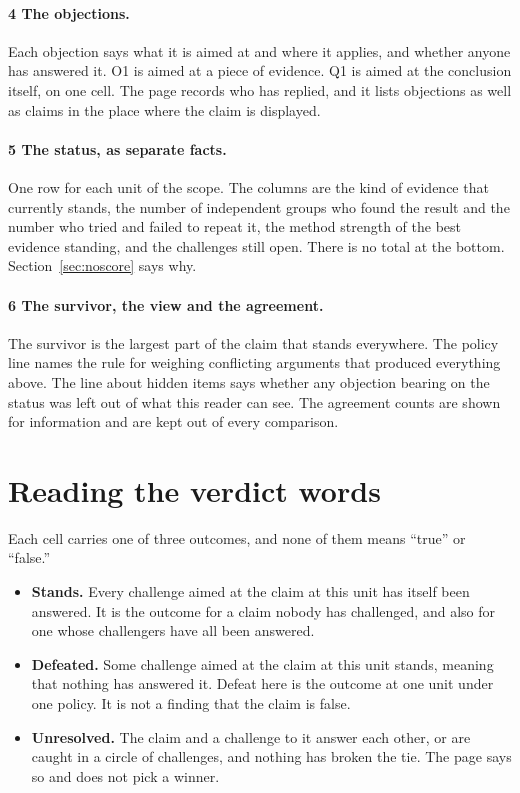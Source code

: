 \documentclass[11pt]{article}
\newcommand{\mk}[1]{\textcircled{\scriptsize\bfseries #1}}
\begin{document}
\paragraph{\mk{4} The objections.} Each objection says what it is aimed at and where it applies, and whether anyone has answered it. O1 is aimed at a piece of evidence. Q1 is aimed at the conclusion itself, on one cell. The page records who has replied, and it lists objections as well as claims in the place where the claim is displayed.

\paragraph{\mk{5} The status, as separate facts.} One row for each unit of the scope. The columns are the kind of evidence that currently stands, the number of independent groups who found the result and the number who tried and failed to repeat it, the method strength of the best evidence standing, and the challenges still open. There is no total at the bottom. Section~\ref{sec:noscore} says why.

\paragraph{\mk{6} The survivor, the view and the agreement.} The survivor is the largest part of the claim that stands everywhere. The policy line names the rule for weighing conflicting arguments that produced everything above. The line about hidden items says whether any objection bearing on the status was left out of what this reader can see. The agreement counts are shown for information and are kept out of every comparison.

\section{Reading the verdict words}\label{sec:verdicts}

Each cell carries one of three outcomes, and none of them means ``true'' or ``false.''

\begin{itemize}[nosep]
\item \textbf{Stands.} Every challenge aimed at the claim at this unit has itself been answered. It is the outcome for a claim nobody has challenged, and also for one whose challengers have all been answered.
\item \textbf{Defeated.} Some challenge aimed at the claim at this unit stands, meaning that nothing has answered it. Defeat here is the outcome at one unit under one policy. It is not a finding that the claim is false.
\item \textbf{Unresolved.} The claim and a challenge to it answer each other, or are caught in a circle of challenges, and nothing has broken the tie. The page says so and does not pick a winner.
\end{itemize}
\end{document}
